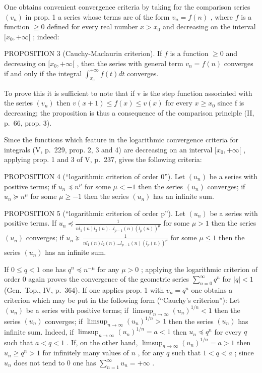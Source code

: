 One obtains convenient convergence criteria by taking for the comparison series \((v_{n})\) in prop. 1 a series whose terms are of the form \(v_{n} = f(n)\) , where \(f\) is a function \(\geqslant 0\) defined for every real number \(x > x_0\) and decreasing on the interval \([x_0, +\infty[\) ; indeed:

PROPOSITION 3 (Cauchy-Maclaurin criterion). If \(f\) is a function \(\geqslant 0\) and decreasing on \([x_0, +\infty[\) , then the series with general term \(v_n = f(n)\) converges if and only if the integral \(\int_{x_0}^{+\infty} f(t) dt\) converges.

To prove this it is sufficient to note that if v is the step function associated with the series \((v_{n})\) then \(v(x+1) \leqslant f(x) \leqslant v(x)\) for every \(x \geqslant x_{0}\) since f is decreasing; the proposition is thus a consequence of the comparison principle (II, p.~66, prop. 3).

Since the functions which feature in the logarithmic convergence criteria for integrals (V, p.~229, prop. 2, 3 and 4) are decreasing on an interval \([x_{0}, +\infty[\) , applying prop. 1 and 3 of V, p.~237, gives the following criteria:

PROPOSITION 4 (``logarithmic criterion of order 0''). Let \((u_{n})\) be a series with positive terms; if \(u_{n} \preccurlyeq n^{\mu}\) for some \(\mu < -1\) then the series \((u_{n})\) converges; if \(u_{n} \succcurlyeq n^{\mu}\) for some \(\mu \geqslant -1\) then the series \((u_{n})\) has an infinite sum.

PROPOSITION 5 (``logarithmic criterion of order p''). Let \((u_{n})\) be a series with positive terms. If \(u_{n} \preccurlyeq \frac{1}{nl_{1}(n)l_{2}(n)\ldots l_{p-1}(n)(l_{p}(n))^{\mu}}\) for some \(\mu > 1\) then the series \((u_{n})\) converges; if \(u_{n} \succcurlyeq \frac{1}{nl_{1}(n)l_{2}(n)\ldots l_{p-1}(n)(l_{p}(n))^{\mu}}\) for some \(\mu \leqslant 1\) then the series \((u_{n})\) has an infinite sum.

If \(0 \leqslant q < 1\) one has \(q^n \preccurlyeq n^{-\mu}\) for any \(\mu > 0\) ; applying the logarithmic criterion of order 0 again proves the convergence of the geometric series \(\sum_{n=0}^{\infty} q^n\) for \(|q| < 1\) (Gen.~Top., IV, p.~364). If one applies prop. 1 with \(v_n = q^n\) one obtains a criterion which may be put in the following form (``Cauchy's criterion''): Let \((u_n)\) be a series with positive terms; if \(\limsup_{n \to \infty} (u_n)^{1/n} < 1\) then the series \((u_n)\) converges; if \(\limsup_{n \to \infty} (u_n)^{1/n} > 1\) then the series \((u_n)\) has infinite sum. Indeed, if \(\limsup_{n \to \infty} (u_n)^{1/n} = a < 1\) then \(u_n \preccurlyeq q^n\) for every \(q\) such that \(a < q < 1\) . If, on the other hand, \(\limsup_{n \to \infty} (u_n)^{1/n} = a > 1\) then \(u_n \geqslant q^n > 1\) for infinitely many values of \(n\) , for any \(q\) such that \(1 < q < a\) ; since \(u_n\) does not tend to 0 one has \(\sum_{n=1}^{\infty} u_n = +\infty\) .

